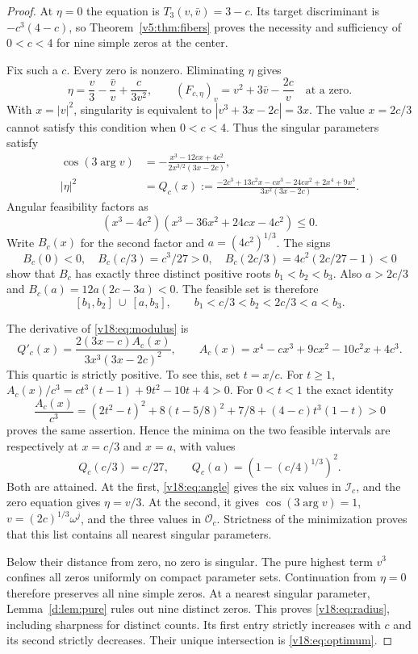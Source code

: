 \documentclass[UTF8,11pt]{ctexart}
\theoremstyle{definition}
\numberwithin{equation}{section}
\begin{document}
\begin{proof}
At $\eta=0$ the equation is $T_3(v,\bar v)=3-c$.
Its target discriminant is $-c^3(4-c)$, so
Theorem~\ref{v5:thm:fibers} proves the necessity and sufficiency
of $0<c<4$ for nine simple zeros at the center.

Fix such a $c$. Every zero is nonzero. Eliminating $\eta$ gives
\[
 \eta=\frac v3-\frac{\bar v}{v}+\frac{c}{3v^2},\qquad
 (F_{c,\eta})_v=v^2+3\bar v-\frac{2c}{v}
 \quad\text{at a zero}.
\]
With $x=|v|^2$, singularity is equivalent to
$|v^3+3x-2c|=3x$. The value $x=2c/3$ cannot satisfy this
condition when $0<c<4$. Thus the singular parameters satisfy
\begin{align}
 \cos(3\arg v)&=
 -\frac{x^3-12cx+4c^2}{2x^{3/2}(3x-2c)},
                                      \label{v18:eq:angle}\\
 |\eta|^2&=Q_c(x):=
 \frac{-2c^3+13c^2x-cx^3-24cx^2+2x^4+9x^3}
      {3x^2(3x-2c)}.                 \label{v18:eq:modulus}
\end{align}
Angular feasibility factors as
\begin{equation}\label{v18:eq:feasible}
 (x^3-4c^2)(x^3-36x^2+24cx-4c^2)\le0.
\end{equation}
Write $B_c(x)$ for the second factor and $a=(4c^2)^{1/3}$.
The signs
\[
 B_c(0)<0,\quad B_c(c/3)=c^3/27>0,\quad
 B_c(2c/3)=4c^2(2c/27-1)<0
\]
show that $B_c$ has exactly three distinct positive roots
$b_1<b_2<b_3$. Also $a>2c/3$ and
$B_c(a)=12a(2c-3a)<0$. The feasible set is therefore
\[
 [b_1,b_2]\ \cup\ [a,b_3],\qquad
 b_1<c/3<b_2<2c/3<a<b_3.
\]

The derivative of \eqref{v18:eq:modulus} is
\[
 Q'_c(x)=\frac{2(3x-c)A_c(x)}{3x^3(3x-2c)^2},\qquad
 A_c(x)=x^4-cx^3+9cx^2-10c^2x+4c^3.
\]
This quartic is strictly positive. To see this, set $t=x/c$.
For $t\ge1$,
$A_c(x)/c^3=ct^3(t-1)+9t^2-10t+4>0$.
For $0<t<1$ the exact identity
\[
 \frac{A_c(x)}{c^3}
 =(2t^2-t)^2+8(t-5/8)^2+7/8+(4-c)t^3(1-t)>0
\]
proves the same assertion. Hence the minima on the two feasible
intervals are respectively at $x=c/3$ and $x=a$, with values
\[
 Q_c(c/3)=c/27,\qquad
 Q_c(a)=\left(1-(c/4)^{1/3}\right)^2.
\]
Both are attained. At the first, \eqref{v18:eq:angle} gives
the six values in $\mathcal I_c$, and the zero equation gives
$\eta=v/3$. At the second, it gives $\cos(3\arg v)=1$,
$v=(2c)^{1/3}\omega^j$, and the three values in
$\mathcal O_c$. Strictness of the minimization proves that
this list contains all nearest singular parameters.

Below their distance from zero, no zero is singular. The pure
highest term $v^3$ confines all zeros uniformly on compact
parameter sets. Continuation from $\eta=0$ therefore preserves
all nine simple zeros. At a nearest singular parameter,
Lemma~\ref{d:lem:pure} rules out nine distinct zeros. This proves
\eqref{v18:eq:radius}, including sharpness for distinct counts.
Its first entry strictly increases with $c$ and its second
strictly decreases. Their unique intersection is
\eqref{v18:eq:optimum}.


\end{proof}
\end{document}
